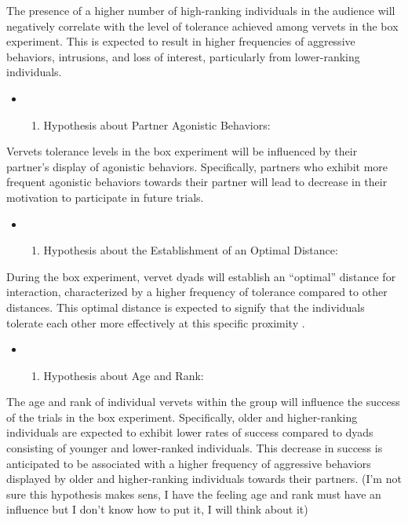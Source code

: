 \documentclass[
]{article}
\providecommand{\tightlist}{%
  \setlength{\itemsep}{0pt}\setlength{\parskip}{0pt}}
\begin{document}
The presence of a higher number of high-ranking individuals in the
audience will negatively correlate with the level of tolerance achieved
among vervets in the box experiment. This is expected to result in
higher frequencies of aggressive behaviors, intrusions, and loss of
interest, particularly from lower-ranking individuals.

\begin{itemize}
\item
  \begin{enumerate}
  \def\labelenumi{\arabic{enumi}.}
  \setcounter{enumi}{1}
  \tightlist
  \item
    Hypothesis about Partner Agonistic Behaviors:
  \end{enumerate}
\end{itemize}

Vervets tolerance levels in the box experiment will be influenced by
their partner's display of agonistic behaviors. Specifically, partners
who exhibit more frequent agonistic behaviors towards their partner will
lead to decrease in their motivation to participate in future trials.

\begin{itemize}
\item
  \begin{enumerate}
  \def\labelenumi{\arabic{enumi}.}
  \setcounter{enumi}{2}
  \tightlist
  \item
    Hypothesis about the Establishment of an Optimal Distance:
  \end{enumerate}
\end{itemize}

During the box experiment, vervet dyads will establish an ``optimal''
distance for interaction, characterized by a higher frequency of
tolerance compared to other distances. This optimal distance is expected
to signify that the individuals tolerate each other more effectively at
this specific proximity .

\begin{itemize}
\item
  \begin{enumerate}
  \def\labelenumi{\arabic{enumi}.}
  \setcounter{enumi}{3}
  \tightlist
  \item
    Hypothesis about Age and Rank:
  \end{enumerate}
\end{itemize}

The age and rank of individual vervets within the group will influence
the success of the trials in the box experiment. Specifically, older and
higher-ranking individuals are expected to exhibit lower rates of
success compared to dyads consisting of younger and lower-ranked
individuals. This decrease in success is anticipated to be associated
with a higher frequency of aggressive behaviors displayed by older and
higher-ranking individuals towards their partners. (I'm not sure this
hypothesis makes sens, I have the feeling age and rank must have an
influence but I don't know how to put it, I will think about it)
\end{document}
